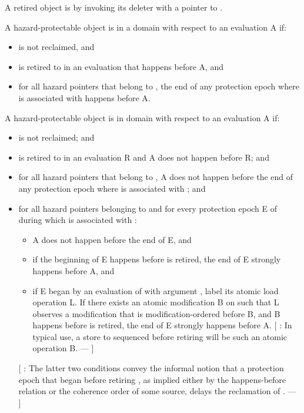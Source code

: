 \pnum
A retired object  is  by invoking its deleter with a pointer to .

\pnum
A hazard-protectable object  is  in a domain  with respect to
an evaluation A if:

\begin{itemize}
\item {} is not reclaimed, and
\item {} is retired to  in an evaluation that happens before A, and
\item for all hazard pointers  that belong to , the end of any protection epoch where  is associated with  happens before A.
\end{itemize}

\pnum
A hazard-protectable object  is  in domain  with respect to an
evaluation A if:
\begin{itemize}
\item {} is not reclaimed; and
\item {} is retired to  in an evaluation R and A does not happen before R; and
\item for all hazard pointers  that belong to , A does not happen before the end of
any protection epoch where  is associated with ; and
\item for all hazard pointers  belonging to  and for every protection epoch E of 
during which  is associated with :
\begin{itemize}
  \item A does not happen before the end of E, and
  \item if the beginning of E happens before  is retired, the end of E strongly
happens before A, and
  \item if E began by an evaluation of  with argument , label its
atomic load operation L. If there exists an atomic modification B on  such that L observes a modification that is modification-ordered before B, and B happens before  is retired, the end of E strongly happens before A. [ : In typical use, a store to  sequenced before retiring  will be such an atomic operation B. ---  ]
\end{itemize}
[ : The latter two conditions convey the informal notion that a protection epoch that began before retiring , as implied either by the happens-before relation or the coherence order of some source, delays the reclamation of . ---  ]
\end{itemize}

